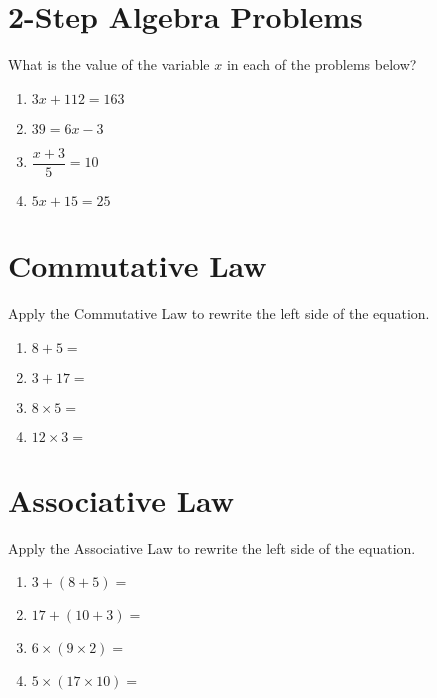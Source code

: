 \documentclass[12pt,letterpaper]{article}
\begin{document}
\section*{2-Step Algebra Problems}
What is the value of the variable $x$ in each of the problems below?
\begin{enumerate}

\item $3x + 112 = 163$

\addvspace{1.3in}

\item $39 = 6x - 3$

\addvspace{1.3in}

\item $\dfrac{x + 3}{5} = 10$

\addvspace{1.3in}

\item $5x + 15 = 25$

\addvspace{1.3in}
\end{enumerate}

\clearpage

\section*{Commutative Law}
Apply the Commutative Law to rewrite the left side of the equation.
\begin{enumerate}
\item $8 + 5 = $

\addvspace{0.3in}

\item $3 + 17 = $

\addvspace{0.3in}

\item $8 \times 5 = $

\addvspace{0.3in}

\item $12 \times 3 = $

\addvspace{1in}
\end{enumerate}

\section*{Associative Law}
Apply the Associative Law to rewrite the left side of the equation.
\begin{enumerate}
\item $3 + (8 + 5) = $

\addvspace{0.3in}

\item $17 + (10 + 3) = $

\addvspace{0.3in}

\item $6 \times (9 \times 2) = $

\addvspace{0.3in}

\item $5 \times (17 \times 10) = $

\addvspace{0.3in}
\end{enumerate}
\end{document}
